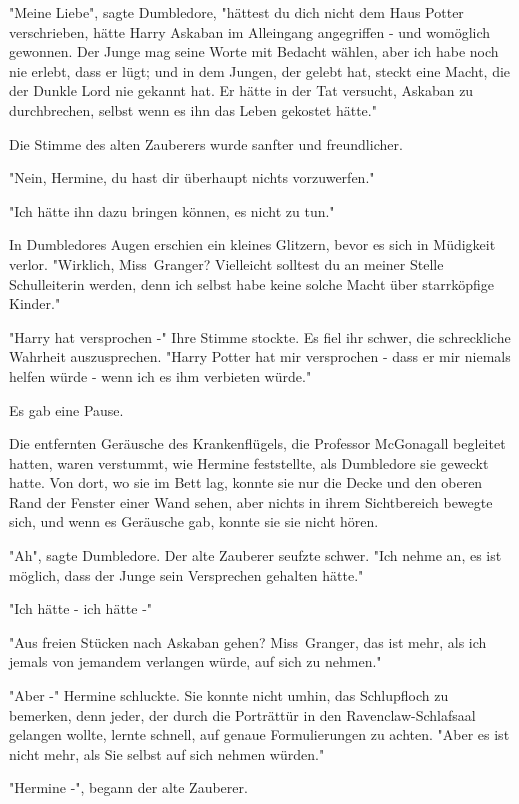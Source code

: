 {"Meine Liebe", sagte Dumbledore, "hättest du dich nicht dem Haus Potter verschrieben, hätte Harry Askaban im Alleingang angegriffen - und womöglich gewonnen. Der Junge mag seine Worte mit Bedacht wählen, aber ich habe noch nie erlebt, dass er lügt; und in dem Jungen, der gelebt hat, steckt eine Macht, die der Dunkle Lord nie gekannt hat. Er hätte in der Tat versucht, Askaban zu durchbrechen, selbst wenn es ihn das Leben gekostet hätte."

Die Stimme des alten Zauberers wurde sanfter und freundlicher.

"Nein, Hermine, du hast dir überhaupt nichts vorzuwerfen."

"Ich hätte ihn dazu bringen können, es nicht zu tun."

In Dumbledores Augen erschien ein kleines Glitzern, bevor es sich in Müdigkeit verlor. "Wirklich, Miss~Granger? Vielleicht solltest du an meiner Stelle Schulleiterin werden, denn ich selbst habe keine solche Macht über starrköpfige Kinder."

"Harry hat versprochen -" Ihre Stimme stockte. Es fiel ihr schwer, die schreckliche Wahrheit auszusprechen. "Harry Potter hat mir versprochen - dass er mir niemals helfen würde - wenn ich es ihm verbieten würde."

Es gab eine Pause.

Die entfernten Geräusche des Krankenflügels, die Professor McGonagall begleitet hatten, waren verstummt, wie Hermine feststellte, als Dumbledore sie geweckt hatte. Von dort, wo sie im Bett lag, konnte sie nur die Decke und den oberen Rand der Fenster einer Wand sehen, aber nichts in ihrem Sichtbereich bewegte sich, und wenn es Geräusche gab, konnte sie sie nicht hören.

"Ah", sagte Dumbledore. Der alte Zauberer seufzte schwer. "Ich nehme an, es ist möglich, dass der Junge sein Versprechen gehalten hätte."

"Ich hätte - ich hätte -"

"Aus freien Stücken nach Askaban gehen? Miss~Granger, das ist mehr, als ich jemals von jemandem verlangen würde, auf sich zu nehmen."

"Aber -" Hermine schluckte. Sie konnte nicht umhin, das Schlupfloch zu bemerken, denn jeder, der durch die Porträttür in den Ravenclaw-Schlafsaal gelangen wollte, lernte schnell, auf genaue Formulierungen zu achten. "Aber es ist nicht mehr, als Sie selbst auf sich nehmen würden."

"Hermine -", begann der alte Zauberer.

}
